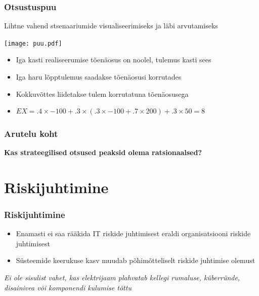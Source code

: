 \begin{frame}[fragile]
  \frametitle{Otsustuspuu}
  Lihtne vahend stsenaariumide visualiseerimiseks ja läbi arvutamiseks
  	\begin{center}
			\texttt{[image: puu.pdf]}
	\end{center}
	\begin{itemize}
		\item Iga kasti realiseerumise tõenäosus on noolel, tulemus kasti sees
		\item Iga haru lõpptulemus saadakse tõenäosusi korrutades
		\item Kokkuvõttes liidetakse tulem korrutatuna tõenäosusega
		\item $EX=.4\times-100+.3\times(.3\times-100+.7\times200)+.3\times50=8$
	\end{itemize}

\end{frame}


\begin{frame}[fragile]
  \frametitle{Arutelu koht}
		\begin{center}
			\textbf{Kas strateegilised otsused peaksid olema ratsionaalsed?}
		\end{center}
\end{frame}

\section{Riskijuhtimine}

\begin{frame}[fragile]
  \frametitle{Riskijuhtimine}
	
	\begin{itemize}
		\item Enamasti ei saa rääkida IT riskide juhtimisest eraldi organisatsiooni riskide juhtimisest
		\item Süsteemide keerukuse kasv muudab põhimõtteliselt riskide juhtimise olemust
	\end{itemize}

	\begin{center}
		\emph{Ei ole sisulist vahet, kas elektrijaam plahvatab kellegi rumaluse, küberründe, disainivea või komponendi kulumise tõttu}
	\end{center}
\end{frame}

